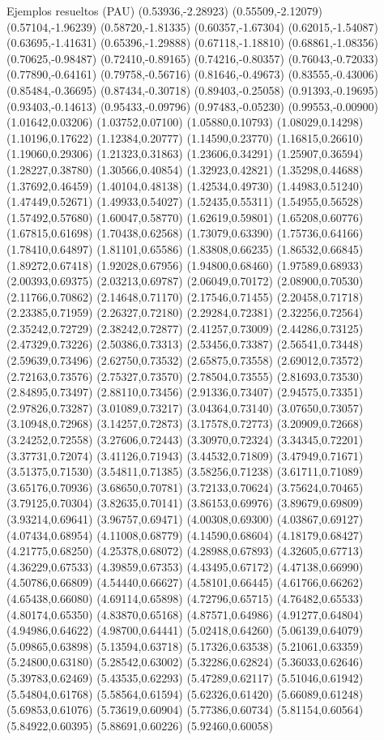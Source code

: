 \documentclass[11pt,a4paper]{article}
\begin{document}
\begin{fmex}{Ejemplos resueltos (PAU)}
(0.53936,-2.28923) (0.55509,-2.12079) (0.57104,-1.96239) (0.58720,-1.81335) (0.60357,-1.67304) (0.62015,-1.54087) (0.63695,-1.41631) (0.65396,-1.29888) (0.67118,-1.18810) (0.68861,-1.08356) (0.70625,-0.98487) (0.72410,-0.89165) (0.74216,-0.80357) (0.76043,-0.72033) (0.77890,-0.64161) (0.79758,-0.56716) (0.81646,-0.49673) (0.83555,-0.43006) (0.85484,-0.36695) (0.87434,-0.30718) (0.89403,-0.25058) (0.91393,-0.19695) (0.93403,-0.14613) (0.95433,-0.09796) (0.97483,-0.05230) (0.99553,-0.00900) (1.01642,0.03206) (1.03752,0.07100) (1.05880,0.10793) (1.08029,0.14298) (1.10196,0.17622) (1.12384,0.20777) (1.14590,0.23770) (1.16815,0.26610) (1.19060,0.29306) (1.21323,0.31863) (1.23606,0.34291) (1.25907,0.36594) (1.28227,0.38780) (1.30566,0.40854) (1.32923,0.42821) (1.35298,0.44688) (1.37692,0.46459) (1.40104,0.48138) (1.42534,0.49730) (1.44983,0.51240) (1.47449,0.52671) (1.49933,0.54027) (1.52435,0.55311) (1.54955,0.56528) (1.57492,0.57680) (1.60047,0.58770) (1.62619,0.59801) (1.65208,0.60776) (1.67815,0.61698) (1.70438,0.62568) (1.73079,0.63390) (1.75736,0.64166) (1.78410,0.64897) (1.81101,0.65586) (1.83808,0.66235) (1.86532,0.66845) (1.89272,0.67418) (1.92028,0.67956) (1.94800,0.68460) (1.97589,0.68933) (2.00393,0.69375) (2.03213,0.69787) (2.06049,0.70172) (2.08900,0.70530) (2.11766,0.70862) (2.14648,0.71170) (2.17546,0.71455) (2.20458,0.71718) (2.23385,0.71959) (2.26327,0.72180) (2.29284,0.72381) (2.32256,0.72564) (2.35242,0.72729) (2.38242,0.72877) (2.41257,0.73009) (2.44286,0.73125) (2.47329,0.73226) (2.50386,0.73313) (2.53456,0.73387) (2.56541,0.73448) (2.59639,0.73496) (2.62750,0.73532) (2.65875,0.73558) (2.69012,0.73572) (2.72163,0.73576) (2.75327,0.73570) (2.78504,0.73555) (2.81693,0.73530) (2.84895,0.73497) (2.88110,0.73456) (2.91336,0.73407) (2.94575,0.73351) (2.97826,0.73287) (3.01089,0.73217) (3.04364,0.73140) (3.07650,0.73057) (3.10948,0.72968) (3.14257,0.72873) (3.17578,0.72773) (3.20909,0.72668) (3.24252,0.72558) (3.27606,0.72443) (3.30970,0.72324) (3.34345,0.72201) (3.37731,0.72074) (3.41126,0.71943) (3.44532,0.71809) (3.47949,0.71671) (3.51375,0.71530) (3.54811,0.71385) (3.58256,0.71238) (3.61711,0.71089) (3.65176,0.70936) (3.68650,0.70781) (3.72133,0.70624) (3.75624,0.70465) (3.79125,0.70304) (3.82635,0.70141) (3.86153,0.69976) (3.89679,0.69809) (3.93214,0.69641) (3.96757,0.69471) (4.00308,0.69300) (4.03867,0.69127) (4.07434,0.68954) (4.11008,0.68779) (4.14590,0.68604) (4.18179,0.68427) (4.21775,0.68250) (4.25378,0.68072) (4.28988,0.67893) (4.32605,0.67713) (4.36229,0.67533) (4.39859,0.67353) (4.43495,0.67172) (4.47138,0.66990) (4.50786,0.66809) (4.54440,0.66627) (4.58101,0.66445) (4.61766,0.66262) (4.65438,0.66080) (4.69114,0.65898) (4.72796,0.65715) (4.76482,0.65533) (4.80174,0.65350) (4.83870,0.65168) (4.87571,0.64986) (4.91277,0.64804) (4.94986,0.64622) (4.98700,0.64441) (5.02418,0.64260) (5.06139,0.64079) (5.09865,0.63898) (5.13594,0.63718) (5.17326,0.63538) (5.21061,0.63359) (5.24800,0.63180) (5.28542,0.63002) (5.32286,0.62824) (5.36033,0.62646) (5.39783,0.62469) (5.43535,0.62293) (5.47289,0.62117) (5.51046,0.61942) (5.54804,0.61768) (5.58564,0.61594) (5.62326,0.61420) (5.66089,0.61248) (5.69853,0.61076) (5.73619,0.60904) (5.77386,0.60734) (5.81154,0.60564) (5.84922,0.60395) (5.88691,0.60226) (5.92460,0.60058) 
\end{fmex}
\end{document}
